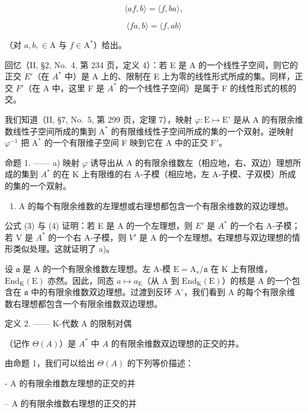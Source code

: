 \[
\langle a f, b \rangle = \langle f, b a \rangle ,\tag{3}
\]

\[
\langle f a, b \rangle = \langle f, a b \rangle\tag{4}
\]

（对 \(a, b, \in \mathrm{A}\) 与 \(f \in \mathrm{A}^*\)）给出。

回忆（II, §2, No.~4, 第 234 页，定义 4）：若 E 是 A 的一个线性子空间，则它的正交 \(E'\)（在 \(A^{*}\) 中）是 A 上的、限制在 E 上为零的线性形式所成的集。同样，正交 \(F'\)（在 A 中，这里 F 是 \(A^{*}\) 的一个线性子空间）是属于 F 的线性形式的核的交。

我们知道（II, §7, No.~5, 第 299 页，定理 7），映射 \(\varphi : \mathrm{E} \mapsto \mathrm{E}'\) 是从 A 的有限余维数线性子空间所成的集到 \(\mathrm{A}^*\) 的有限维线性子空间所成的集的一个双射。逆映射 \(\varphi^{-1}\) 把 \(\mathrm{A}^*\) 的一个有限维子空间 F 映到它在 A 中的正交 \(\mathrm{F}'\)。

命题 1. —— a) 映射 \(\varphi\) 诱导出从 A 的有限余维数左（相应地，右、双边）理想所成的集到 \(A^{*}\) 的在 K 上有限维的右 A-子模（相应地，左 A-子模、子双模）所成的集的一个双射。

\begin{enumerate}
\def\labelenumi{\alph{enumi})}
\setcounter{enumi}{1}
\tightlist
\item
  A 的每个有限余维数的左理想或右理想都包含一个有限余维数的双边理想。
\end{enumerate}

公式 (3) 与 (4) 证明：若 E 是 A 的一个左理想，则 \(E'\) 是 \(A^{*}\) 的一个右 A-子模；若 V 是 \(A^{*}\) 的一个右 A-子模，则 \(V'\) 是 A 的一个左理想。右理想与双边理想的情形类似处理。这就证明了 a)。

设 \(\mathfrak{a}\) 是 A 的一个有限余维数左理想。左 A-模 \(\mathrm{E} = \mathrm{A}_s / \mathfrak{a}\) 在 K 上有限维，\(\mathrm{End}_{\mathrm{K}}(\mathrm{E})\) 亦然。因此，同态 \(a \mapsto a_{\mathrm{E}}\)（从 A 到 \(\mathrm{End}_{\mathrm{K}}(\mathrm{E})\)）的核是 A 的一个包含在 \(\mathfrak{a}\) 中的有限余维数双边理想。过渡到反环 \(\mathrm{A}^{\circ}\)，我们看到 A 的每个有限余维数右理想都包含一个有限余维数双边理想。

定义 2. —— K-代数 A 的限制对偶

（记作 \(\Theta(A)\)）是 \(A^{*}\) 中 \(A\) 的有限余维数双边理想的正交的并。

由命题 1，我们可以给出 \(\Theta(A)\) 的下列等价描述：

- A 的有限余维数左理想的正交的并

-- A 的有限余维数右理想的正交的并

